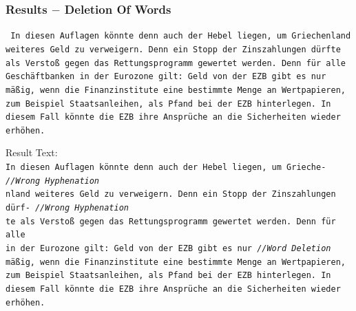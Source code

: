 \documentclass{beamer}
\begin{document}








































\begin{frame}
\frametitle{Results $-$ Deletion Of Words}
\texttt{\tiny
In diesen Auflagen könnte denn auch der Hebel liegen, um Griechenland \\
weiteres Geld zu verweigern. Denn ein Stopp der Zinszahlungen dürfte \\
als Verstoß gegen das Rettungsprogramm gewertet werden. Denn für alle \\
Geschäftbanken in der Eurozone gilt: Geld von der EZB gibt es nur \\
mäßig, wenn die Finanzinstitute eine bestimmte Menge an Wertpapieren, \\
zum Beispiel Staatsanleihen, als Pfand bei der EZB hinterlegen. In \\
diesem Fall könnte die EZB ihre Ansprüche an die Sicherheiten wieder \\
erhöhen. \\
}

Result Text: \\

\texttt{\scriptsize{I}\tiny n diesen Auflagen könnte denn auch der Hebel liegen, um Grieche-  \hskip 30pt \emph{//Wrong Hyphenation} \\
\scriptsize{n}\tiny land weiteres Geld zu verweigern. Denn ein Stopp der Zinszahlungen dürf- \emph{//Wrong Hyphenation} \\
\scriptsize{t}\tiny e als Verstoß gegen das Rettungsprogramm gewertet werden. Denn für alle \\
\scriptsize{i}\tiny n der Eurozone gilt: Geld von der EZB gibt es nur \hskip 72pt \emph{//Word Deletion} \\
\scriptsize{m}\tiny äßig, wenn die Finanzinstitute eine bestimmte Menge an Wertpapieren, \\
zum Beispiel Staatsanleihen, als Pfand bei der EZB hinterlegen. In \\
diesem Fall könnte die EZB ihre Ansprüche an die Sicherheiten wieder \\
erhöhen. \\
}
\end{frame}
\end{document}
